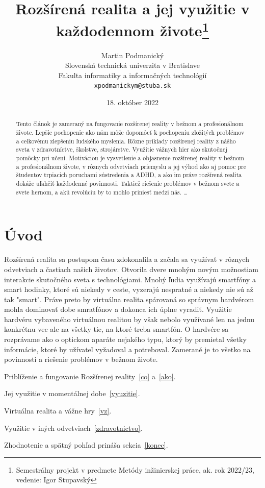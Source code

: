 \documentclass[10pt,twoside,a4paper]{article}
\title{Rozšírená realita a jej využitie v každodennom živote\thanks{Semestrálny projekt v predmete Metódy inžinierskej práce, ak. rok 2022/23, vedenie: Igor Stupavský}} %
\author{Martin Podmanický\\[2pt]
	{\small Slovenská technická univerzita v Bratislave}\\
	{\small Fakulta informatiky a informačných technológií}\\
	{\small \texttt{xpodmanickym@stuba.sk}}
	}
\date{\small 18. október 2022} %
\begin{document}
\maketitle

\begin{abstract}
Tento článok je zameraný na fungovanie rozšírenej reality v bežnom a profesionálnom živote. Lepšie pochopenie ako nám môže dopomôcť k pochopeniu zložitých problémov a celkovému zlepšeniu ľudského myslenia. Rôzne príklady rozšírenej reality z nášho sveta v zdravotníctve, školstve, strojárstve. Využitie vážnych hier ako skutočnej pomôcky pri učení. Motiváciou je vysvetlenie a objasnenie rozšírenej reality v bežnom a profesionálnom živote, v rôznych odvetviach priemyslu a jej výhod ako aj pomoc pre študentov trpiacich poruchami sústredenia a ADHD, a ako im práve rozšírená realita dokáže uľahčiť každodenné povinnosti. Taktiež riešenie problémov v bežnom svete a svete hernom, a akú revolúciu by to mohlo priniesť medzi nás.
\ldots
\end{abstract}



\section{Úvod}
 Rozšírená realita sa postupom času zdokonalila a začala sa využívať v rôznych odvetviach a častiach našich životov. Otvorila dvere mnohým novým možnostiam interakcie skutočného sveta s technológiami. Mnohý ľudia využívajú smartfóny a smart hodinky, ktoré sú niekedy v ceste, vyzerajú nespratné a niekedy nie sú až tak "smart". Práve preto by virtuálna realita spárovaná so správnym hardvérom mohla dominovať dobe smratfónov a dokonca ich úplne vyradiť. Využitie hardvéru vybaveného virtuálnou realitou by však nebolo využívané len na jednu konkrétnu vec ale na všetky tie, na ktoré treba smartfón. O hardvére sa rozprávame ako o optickom aparáte nejakého typu, ktorý by premietal všetky informácie, ktoré by užívateľ vyžadoval a potreboval. Zamerané je to všetko na povinnosti a riešenie problémov v bežnom živote.


\par Priblíženie a fungovanie Rozšírenej reality~\ref{co} a~\ref{ako}.
\par Jej využitie v momentálnej dobe~\ref{vyuzitie}.
\par Virtuálna realita a vážne hry~\ref{vz}.
\par Využitie v iných odvetviach~\ref{zdravotnictvo}.
\par Zhodnotenie a spätný pohľad prináša sekcia~\ref{konec}.
\end{document}

